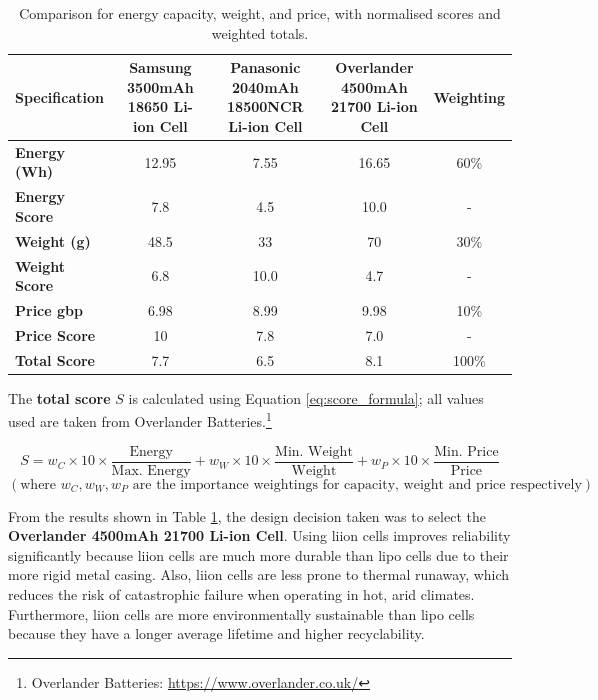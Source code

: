 \begin{table}[h!]
\centering
\begin{tabular}{|l|c|c|c|c|}
\hline
\textbf{Specification} & 
\makecell{\textbf{Samsung}\\\textbf{3500mAh}\\\textbf{18650 Li-ion Cell}} &
\makecell{\textbf{Panasonic}\\\textbf{2040mAh}\\\textbf{18500NCR Li-ion Cell}} & 
\makecell{\textbf{Overlander}\\\textbf{4500mAh}\\\textbf{21700 Li-ion Cell}} & 
\textbf{Weighting} \\
\hline
\textbf{Energy (Wh)} & 12.95 & 7.55 & 16.65 & 60\%\\
\textbf{Energy Score} & 7.8& 4.5& 10.0& - \\\hline
\textbf{Weight (g)} & 48.5 & 33 & 70 & 30\% \\
\textbf{Weight Score} & 6.8& 10.0& 4.7& - \\
\hline
\textbf{Price \acrshort{gbp}} & 6.98 & 8.99 & 9.98& 10\%\\
\textbf{Price Score} & 10& 7.8& 7.0& - \\
\hline
\textbf{Total Score} & 7.7& 6.5& 8.1& 100\% \\
\hline
\end{tabular}
\caption[Battery Cell Comparison]{Comparison for energy capacity, weight, and price, with normalised scores and weighted totals.}
\label{tab:battery_comparison}
\end{table}

The \textbf{total score} \( S \) is calculated using Equation \ref{eq:score_formula}; all values used are taken from Overlander Batteries.\footnote{Overlander Batteries: \url{https://www.overlander.co.uk/}}

\begin{equation} \label{eq:score_formula}
S = w_C \times 10 \times\frac{\text{Energy}}{\text{Max. Energy}} + w_W \times 10 \times\frac{\text{Min. Weight}}{\text{Weight}} + w_P \times 10 \times\frac{\text{Min. Price}}{\text{Price}}
\end{equation}
\[(
\text{where }w_C, w_W, w_P \text{ are the importance weightings for capacity, weight and price respectively})
\]

From the results shown in Table \ref{tab:battery_comparison}, the design decision taken was to select the \textbf{Overlander 4500mAh 21700 Li-ion Cell}. Using \acrshort{liion} cells improves reliability significantly because \acrshort{liion} cells are much more durable than \acrshort{lipo} cells due to their more rigid metal casing. Also, \acrshort{liion} cells are less prone to thermal runaway, which reduces the risk of catastrophic failure when operating in hot, arid climates. Furthermore, \acrshort{liion} cells are more environmentally sustainable than \acrshort{lipo} cells because they have a longer average lifetime and higher recyclability.

